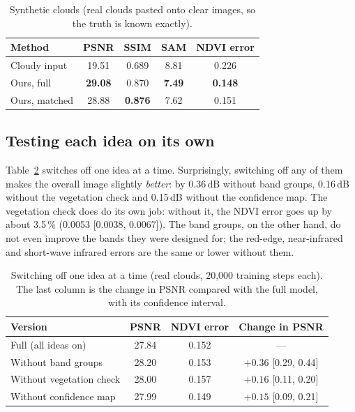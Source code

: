 \documentclass[conference]{IEEEtran}
\newcommand{\best}[1]{\textbf{#1}}
\begin{document}
\begin{table}[t]
\centering
\caption{Synthetic clouds (real clouds pasted onto clear images, so the truth is known exactly).}
\label{tab:synth}
\setlength{\tabcolsep}{4pt}
\begin{tabular}{lcccc}
\toprule
Method & PSNR & SSIM & SAM & NDVI error \\
\midrule
Cloudy input & 19.51 & 0.689 & 8.81 & 0.226 \\
Ours, full & \best{29.08} & 0.870 & \best{7.49} & \best{0.148} \\
Ours, matched & 28.88 & \best{0.876} & 7.62 & 0.151 \\
\bottomrule
\end{tabular}
\end{table}

\subsection{Testing each idea on its own}
Table~\ref{tab:abl} switches off one idea at a time. Surprisingly, switching off any of them makes
the overall image slightly \emph{better}: by 0.36\,dB without band groups, 0.16\,dB without the
vegetation check and 0.15\,dB without the confidence map. The vegetation check does do its own job:
without it, the NDVI error goes up by about 3.5\,\% (0.0053 [0.0038, 0.0067]). The band groups,
on the other hand, do not even improve the bands they were designed for; the red-edge,
near-infrared and short-wave infrared errors are the same or lower without them.

\begin{table}[t]
\centering
\caption{Switching off one idea at a time (real clouds, 20,000 training steps each). The last
column is the change in PSNR compared with the full model, with its confidence interval.}
\label{tab:abl}
\setlength{\tabcolsep}{3pt}
\begin{tabular}{lccc}
\toprule
Version & PSNR & NDVI error & Change in PSNR \\
\midrule
Full (all ideas on) & 27.84 & 0.152 & --- \\
Without band groups & 28.20 & 0.153 & $+0.36$ [0.29, 0.44] \\
Without vegetation check & 28.00 & 0.157 & $+0.16$ [0.11, 0.20] \\
Without confidence map & 27.99 & 0.149 & $+0.15$ [0.09, 0.21] \\
\bottomrule
\end{tabular}
\end{table}
\end{document}

